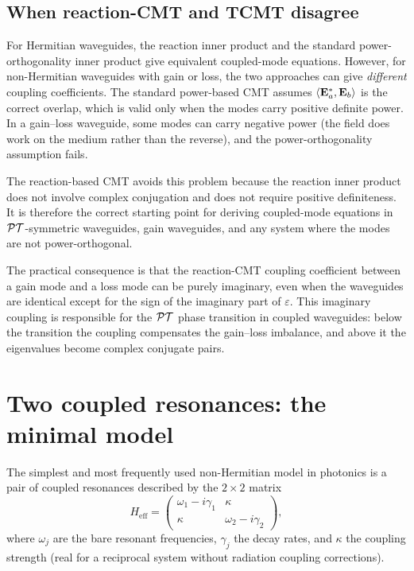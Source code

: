 \subsection{When reaction-CMT and TCMT disagree}
\label{ssec:reaction-tcmt-disagree}

For Hermitian waveguides, the reaction inner product and the standard
power-orthogonality inner product give equivalent coupled-mode
equations. However, for non-Hermitian waveguides with gain or loss,
the two approaches can give \emph{different} coupling coefficients.
The standard power-based CMT assumes $\langle\mathbf{E}_a^*,\mathbf{E}_b\rangle$ is
the correct overlap, which is valid only when the modes carry positive
definite power. In a gain--loss waveguide, some modes can carry
negative power (the field does work on the medium rather than the
reverse), and the power-orthogonality assumption fails.

The reaction-based CMT avoids this problem because the reaction inner
product does not involve complex conjugation and does not require
positive definiteness. It is therefore the correct starting point for
deriving coupled-mode equations in $\mathcal{PT}$-symmetric waveguides, gain
waveguides, and any system where the modes are not power-orthogonal.

The practical consequence is that the reaction-CMT coupling coefficient
between a gain mode and a loss mode can be purely imaginary, even when
the waveguides are identical except for the sign of the imaginary part
of $\varepsilon$. This imaginary coupling is responsible for the
$\mathcal{PT}$ phase transition in coupled waveguides: below the transition
the coupling compensates the gain--loss imbalance, and above it the
eigenvalues become complex conjugate pairs.


\section{Two coupled resonances: the minimal model}
\label{sec:two-mode}

The simplest and most frequently used non-Hermitian model in photonics
is a pair of coupled resonances described by the $2\times 2$ matrix
\begin{equation}
 H_{\mathrm{eff}} =
 \begin{pmatrix}
 \omega_1 - i\gamma_1 & \kappa \\
 \kappa & \omega_2 - i\gamma_2
 \end{pmatrix},
 \label{eq:two-mode-H}
\end{equation}
where $\omega_j$ are the bare resonant frequencies, $\gamma_j$ the decay
rates, and $\kappa$ the coupling strength (real for a reciprocal system
without radiation coupling corrections).

